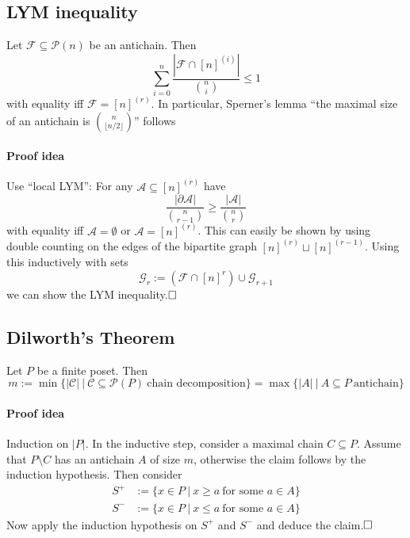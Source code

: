 
\subsection{LYM inequality}
Let $\mathcal{F} \subseteq \mathcal{P}(n)$ be an antichain. Then
\begin{equation*}
    \sum_{i = 0}^n \frac {| \mathcal{F} \cap [n]^{(i)} |} {{n \choose i}} \leq 1
\end{equation*}
with equality iff $\mathcal{F} = [n]^{(r)}$. 
In particular, Sperner's lemma ``the maximal size of an antichain is ${n \choose \lfloor n/2 \rfloor}$'' follows
\paragraph{Proof idea} Use ``local LYM'': For any $\mathcal{A} \subseteq [n]^{(r)}$ have
\begin{equation*}
    \frac {|\partial\mathcal{A}|} {{n \choose r - 1}} \geq \frac {|\mathcal{A}|} {{n \choose r}}
\end{equation*}
with equality iff $\mathcal{A} = \emptyset$ or $\mathcal{A} = [n]^{(r)}$.
This can easily be shown by using double counting on the edges of the bipartite graph $[n]^{(r)} \sqcup [n]^{(r - 1)}$.
Using this inductively with sets
\begin{equation*}
    \mathcal{G}_r := \left(\mathcal{F} \cap [n]^{r}\right) \cup \mathcal{G}_{r + 1}
\end{equation*}
we can show the LYM inequality.$\hfill\square$

\subsection{Dilworth's Theorem}
Let $P$ be a finite poset. Then
\begin{equation*}
    m := \min \{ |\mathcal{C}| \ | \ \mathcal{C} \subseteq \mathcal{P}(P) \ \text{chain decomposition} \} = \max \{ |A| \ | \ A \subseteq P \ \text{antichain} \}
\end{equation*}
\paragraph{Proof idea} Induction on $|P|$. 
In the inductive step, consider a maximal chain $C \subseteq P$.
Assume that $P \setminus C$ has an antichain $A$ of size $m$, otherwise the claim follows by the induction hypothesis.
Then consider
\begin{align*}
    S^+ &:= \{ x \in P \ | \ x \geq a \ \text{for some $a \in A$}\} \\
    S^- &:= \{ x \in P \ | \ x \leq a \ \text{for some $a \in A$}\}
\end{align*}
Now apply the induction hypothesis on $S^+$ and $S^-$ and deduce the claim.$\hfill\square$

